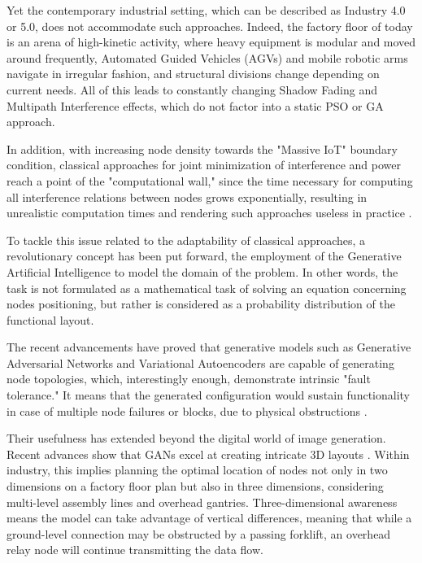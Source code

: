 \documentclass[a4paper,fleqn]{cas-dc}
\numberwithin{equation}{section}
\begin{document}
Yet the contemporary industrial setting, which can be described as Industry 4.0 or 5.0, does not accommodate such approaches. Indeed, the factory floor of today is an arena of high-kinetic activity, where heavy equipment is modular and moved around frequently, Automated Guided Vehicles (AGVs) and mobile robotic arms navigate in irregular fashion, and structural divisions change depending on current needs. All of this leads to constantly changing Shadow Fading and Multipath Interference effects, which do not factor into a static PSO or GA approach.

In addition, with increasing node density towards the "Massive IoT" boundary condition, classical approaches for joint minimization of interference and power reach a point of the "computational wall," since the time necessary for computing all interference relations between nodes grows exponentially, resulting in unrealistic computation times and rendering such approaches useless in practice \cite{Moraes_2024_JointInterference}.

To tackle this issue related to the adaptability of classical approaches, a revolutionary concept has been put forward, the employment of the Generative Artificial Intelligence to model the domain of the problem. In other words, the task is not formulated as a mathematical task of solving an equation concerning nodes positioning, but rather is considered as a probability distribution of the functional layout. 

The recent advancements have proved that generative models such as Generative Adversarial Networks and Variational Autoencoders are capable of generating node topologies, which, interestingly enough, demonstrate intrinsic "fault tolerance." It means that the generated configuration would sustain functionality in case of multiple node failures or blocks, due to physical obstructions \cite{b2}.

Their usefulness has extended beyond the digital world of image generation. Recent advances show that GANs excel at creating intricate 3D layouts \cite{He_2025_GAN_Design}. Within industry, this implies planning the optimal location of nodes not only in two dimensions on a factory floor plan but also in three dimensions, considering multi-level assembly lines and overhead gantries. Three-dimensional awareness means the model can take advantage of vertical differences, meaning that while a ground-level connection may be obstructed by a passing forklift, an overhead relay node will continue transmitting the data flow.
\end{document}
